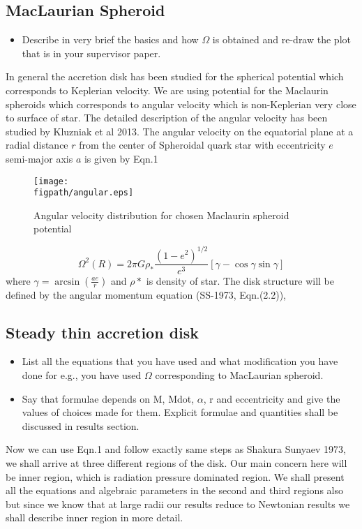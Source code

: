 \documentclass[useAMS,usenatbib]{mn2e}
\newcommand{\figpath}{./Figs/}
\begin{document}
\subsection{MacLaurian Spheroid}
\begin{itemize}
\item Describe in very brief the basics and how $\Omega$ is obtained
  and re-draw the plot that is in your supervisor paper. 
\end{itemize}
In general the accretion disk has been studied for the spherical potential which corresponds to Keplerian velocity. We are using potential for the Maclaurin spheroids which corresponds to angular velocity which is non-Keplerian very close to surface of star. The detailed description of the angular velocity has been studied by Kluzniak et al 2013. The angular velocity on the equatorial plane at a radial distance $r$ from the center of Spheroidal quark star with eccentricity $e$ semi-major axis $a$ is given by Eqn.1
\begin{figure}
\centering
\texttt{[image: \\figpath/angular.eps]}
\caption{Angular velocity distribution for chosen Maclaurin spheroid potential}
\label{fig:steadyplt1}
\end{figure}
\begin{equation}
\Omega ^2 \left(R\right)= 2\pi G\rho_* \frac{(1-e^2)^{1/2}}{e^3}\left[\gamma - \cos \gamma \sin\gamma \right]
\end{equation}  
where $\gamma = \arcsin (\frac{a e}{r})$ and $\rho *$ is density of star.
The disk structure will be defined by the angular momentum equation (SS-1973, Eqn.(2.2)),
\subsection{Steady thin accretion disk}
\begin{itemize}
\item List all the equations that you have used and what modification
  you have done for e.g., you have used $\Omega$ corresponding to
  MacLaurian spheroid. 
\item Say that formulae depends on M, Mdot, $\alpha$, r and
  eccentricity and give the values of choices made for them. 
  Explicit formulae and quantities shall be discussed in results
  section.
\end{itemize}
Now we can use Eqn.1 and follow exactly same steps as Shakura Sunyaev 1973, we shall arrive at three different regions of the disk. Our main concern here will be inner region, which is radiation pressure dominated region. We shall present all the equations and algebraic parameters in the second and third regions also but since we know that at large radii our results reduce to Newtonian results we shall describe inner region in more detail.
\end{document}
